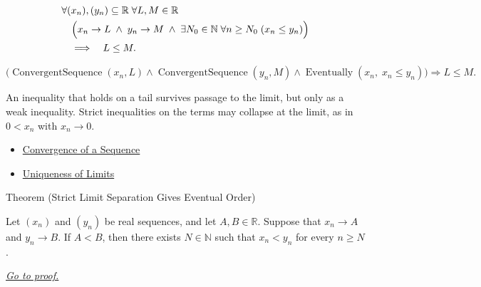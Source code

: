 \begin{remark*}
\[
\begin{aligned}
&\forall (x_n),(y_n)\subseteq\mathbb{R}\;\forall L,M\in\mathbb{R}\\
&\quad\Bigl(
  x_n\to L
  \;\land\;
  y_n\to M
  \;\land\;
  \exists N_0\in\mathbb{N}\;\forall n\ge N_0\;(x_n\le y_n)
\Bigr)\\
&\quad\Longrightarrow\quad L\le M.
\end{aligned}
\]
\end{remark*}

\begin{remark*}
\[
\bigl(
\operatorname{ConvergentSequence}(x_n,L)
\land
\operatorname{ConvergentSequence}(y_n,M)
\land
\operatorname{Eventually}(x_n,\;x_n\le y_n)
\bigr)
\Longrightarrow
L\le M.
\]
\end{remark*}

\begin{remark*}[Interpretation]
An inequality that holds on a tail survives passage to the limit, but only as
a weak inequality. Strict inequalities on the terms may collapse at the
limit, as in $0<x_n$ with $x_n\to 0$.
\end{remark*}

\begin{dependencies}
\begin{itemize}
  \item \hyperref[def:convergent-sequence]{Convergence of a Sequence}
  \item \hyperref[thm:uniqueness-of-limits]{Uniqueness of Limits}
\end{itemize}
\end{dependencies}


\begin{theorembox}{Theorem (Strict Limit Separation Gives Eventual Order)}
\begin{theorem}
\label{thm:strict-limit-separation-gives-eventual-order}

Let $(x_n)$ and $(y_n)$ be real sequences, and let $A,B\in\mathbb{R}$.
Suppose that $x_n\to A$ and $y_n\to B$. If $A<B$, then there exists
$N\in\mathbb{N}$ such that $x_n<y_n$ for every $n\ge N$.

\smallskip
\noindent
\hyperref[prf:strict-limit-separation-gives-eventual-order]{\textit{Go to proof.}}
\end{theorem}
\end{theorembox}


